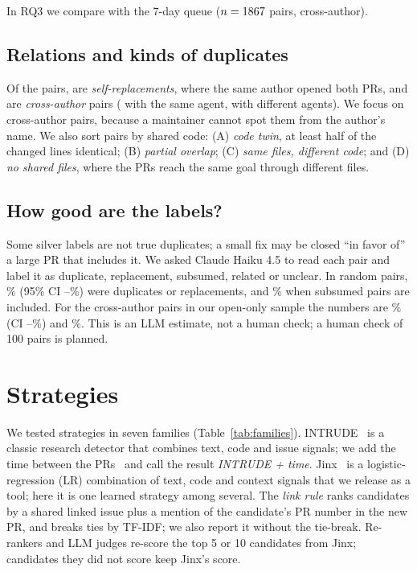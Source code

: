 \documentclass[10pt,conference]{IEEEtran}
\begin{document}
In RQ3 we compare with the 7-day queue ($n=1867$ pairs, \nCrossGseven{} cross-author).

\subsection{Relations and kinds of duplicates}
Of the \nPairs{} pairs, \nSelf{} are \emph{self-replacements}, where the same author opened both PRs, and \nCross{} are \emph{cross-author} pairs (\nSameAgent{} with the same agent, \nCrossAgent{} with different agents). We focus on cross-author pairs, because a maintainer cannot spot them from the author's name. We also sort pairs by shared code: (A) \emph{code twin}, at least half of the changed lines identical; (B) \emph{partial overlap}; (C) \emph{same files, different code}; and (D) \emph{no shared files}, where the PRs reach the same goal through different files.

\subsection{How good are the labels?}
Some silver labels are not true duplicates; a small fix may be closed ``in favor of'' a large PR that includes it. We asked Claude Haiku 4.5 to read each pair and label it as duplicate, replacement, subsumed, related or unclear. In \auditRandN{} random pairs, \auditRandStrict\% (95\% CI \auditRandStrictLo--\auditRandStrictHi\%) were duplicates or replacements, and \auditRandLoose\% when subsumed pairs are included. For the \auditOpenN{} cross-author pairs in our open-only sample the numbers are \auditOpenStrict\% (CI \auditOpenStrictLo--\auditOpenStrictHi\%) and \auditOpenLoose\%. This is an LLM estimate, not a human check; a human check of 100 pairs is planned.

\section{Strategies}
We tested \nStrategies{} strategies in seven families (Table~\ref{tab:families}). INTRUDE~\cite{ren2019intrude} is a classic research detector that combines text, code and issue signals; we add the time between the PRs~\cite{wang2019time} and call the result \emph{INTRUDE + time}. Jinx~\cite{jinxtool} is a logistic-regression (LR) combination of text, code and context signals that we release as a tool; here it is one learned strategy among several. The \emph{link rule} ranks candidates by a shared linked issue plus a mention of the candidate's PR number in the new PR, and breaks ties by TF-IDF; we also report it without the tie-break. Re-rankers and LLM judges re-score the top 5 or 10 candidates from Jinx; candidates they did not score keep Jinx's score.
\end{document}
